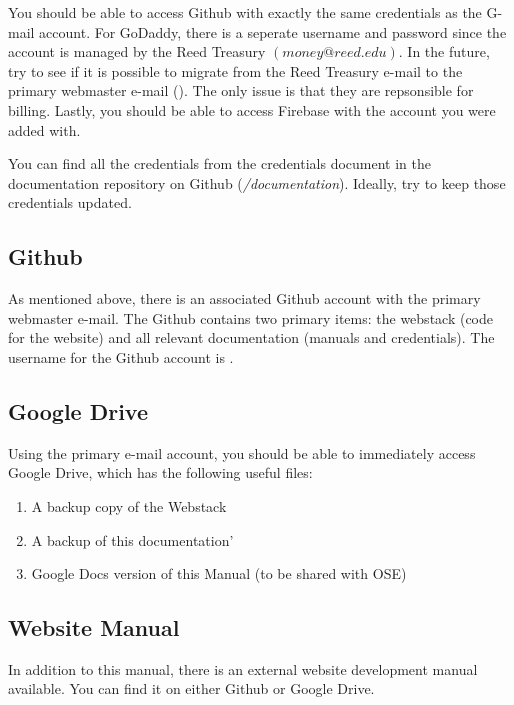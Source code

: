 \documentclass[a4paper]{article}
\begin{document}
\noindent You should be able to access Github with exactly the same credentials as the G-mail account. For GoDaddy, there is a seperate username and password since the account is managed by the Reed Treasury $(money@reed.edu)$. In the future, try to see if it is possible to migrate from the Reed Treasury e-mail to the primary webmaster e-mail (\WMemail). The only issue is that they are repsonsible for billing. Lastly, you should be able to access Firebase with the account you were added with.\newline

\noindent You can find all the credentials from the credentials document in the documentation repository on Github (\GHuser\textit{/documentation}). Ideally, try to keep those credentials updated.

\subsection{Github}

As mentioned above, there is an associated Github account with the primary webmaster e-mail. The Github contains two primary items: the webstack (code for the website) and all relevant documentation (manuals and credentials). The username for the Github account is \GHuser.

\subsection{Google Drive}

Using the primary e-mail account, you should be able to immediately access Google Drive, which has the following useful files:

\begin{enumerate}
 \item A backup copy of the Webstack
 \item A backup of this documentation'
 \item Google Docs version of this Manual (to be shared with OSE)
\end{enumerate}

\subsection{Website Manual}
In addition to this manual, there is an external website development manual available. You can find it on either Github or Google Drive.

\end{document}
